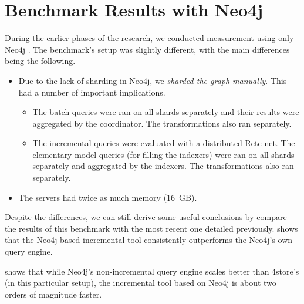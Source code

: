 \section{Benchmark Results with Neo4j}

During the earlier phases of the research, we conducted measurement using only Neo4j \cite{Izso:2012:ODD:2428516.2428523}. The benchmark's setup was slightly different, with the main differences being the following.

\begin{itemize}
  \item Due to the lack of sharding in Neo4j, we \emph{sharded the graph manually}. This had a number of important implications.
  \begin{itemize}
    \item The batch queries were ran on all shards separately and their results were aggregated by the coordinator. The transformations also ran separately. 
    \item The incremental queries were evaluated with a distributed Rete net. The elementary model queries (for filling the indexers) were ran on all shards separately and aggregated by the indexers. The transformations also ran separately.
  \end{itemize}
  \item The servers had twice as much memory (16~GB).
\end{itemize}

Despite the differences, we can still derive some useful conclusions by compare the results of this benchmark with the most recent one detailed previously.  shows that the Neo4j-based incremental tool consistently outperforms the Neo4j's own query engine.


 shows that while Neo4j's non-incremental query engine scales better than 4store's (in this particular setup), the incremental tool based on Neo4j is about two orders of magnitude faster.

